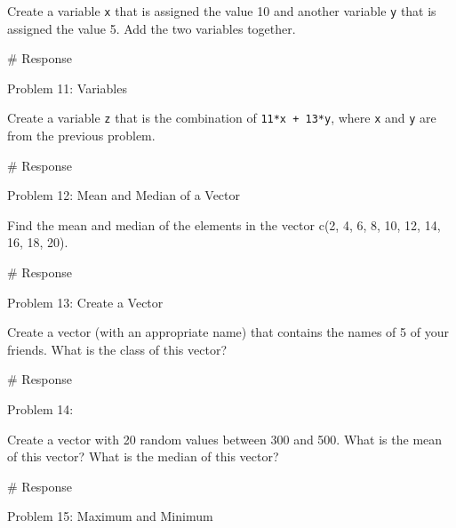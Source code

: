 \documentclass[
  letterpaper,
  DIV=11,
  numbers=noendperiod]{scrreprt}
\newenvironment{Shaded}{\begin{snugshade}}{\end{snugshade}}
\newcommand{\CommentTok}[1]{\textcolor[rgb]{0.37,0.37,0.37}{#1}}
\begin{document}
Create a variable \texttt{x} that is assigned the value 10 and another
variable \texttt{y} that is assigned the value 5. Add the two variables
together.

\begin{Shaded}
\begin{Highlighting}[]
\CommentTok{\# Response}
\end{Highlighting}
\end{Shaded}

Problem 11: Variables

Create a variable \texttt{z} that is the combination of
\texttt{11*x\ +\ 13*y}, where \texttt{x} and \texttt{y} are from the
previous problem.

\begin{Shaded}
\begin{Highlighting}[]
\CommentTok{\# Response}
\end{Highlighting}
\end{Shaded}

Problem 12: Mean and Median of a Vector

Find the mean and median of the elements in the vector c(2, 4, 6, 8, 10,
12, 14, 16, 18, 20).

\begin{Shaded}
\begin{Highlighting}[]
\CommentTok{\# Response}
\end{Highlighting}
\end{Shaded}

Problem 13: Create a Vector

Create a vector (with an appropriate name) that contains the names of 5
of your friends. What is the class of this vector?

\begin{Shaded}
\begin{Highlighting}[]
\CommentTok{\# Response}
\end{Highlighting}
\end{Shaded}

Problem 14:

Create a vector with 20 random values between 300 and 500. What is the
mean of this vector? What is the median of this vector?

\begin{Shaded}
\begin{Highlighting}[]
\CommentTok{\# Response}
\end{Highlighting}
\end{Shaded}

Problem 15: Maximum and Minimum
\end{document}
